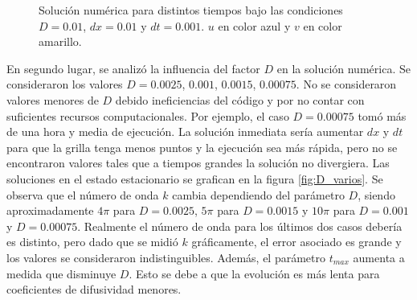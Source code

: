 \documentclass[aps,prb,twocolumn,superscriptaddress,floatfix,longbibliography]{revtex4-2}
\newcounter{para}
\begin{document}
\begin{figure}[h]
\begin{subfigure}[b]{0.3\textwidth}
         \caption{\label{fig:D_0.01_t3}}
     \end{subfigure}
        \caption{Solución numérica para distintos tiempos bajo las condiciones $D = 0.01$, $dx = 0.01$ y $dt = 0.001$. $u$ en color azul y $v$ en color amarillo.}
        \label{fig:D_0.01}
\end{figure}

En segundo lugar, se analizó la influencia del factor $D$ en la solución numérica. Se consideraron los valores $D = 0.0025$, $0.001$, $0.0015$, $0.00075$. No se consideraron valores menores de $D$ debido ineficiencias del código y por no contar con suficientes recursos computacionales. Por ejemplo, el caso $D = 0.00075$ tomó más de una hora y media de ejecución. La solución inmediata sería aumentar $dx$ y $dt$ para que la grilla tenga menos puntos y la ejecución sea más rápida, pero no se encontraron valores tales que a tiempos grandes la solución no divergiera. Las soluciones en el estado estacionario se grafican en la figura \ref{fig:D_varios}. Se observa que el número de onda $k$ cambia dependiendo del parámetro $D$, siendo aproximadamente $4 \pi$ para $D = 0.0025$, $5 \pi$ para $D = 0.0015$ y $10 \pi$ para $D = 0.001$ y $D = 0.00075$. Realmente el número de onda para los últimos dos casos debería es distinto, pero dado que se midió $k$ gráficamente, el error asociado es grande y los valores se consideraron indistinguibles. Además, el parámetro $t_{max}$ aumenta a medida que disminuye $D$. Esto se debe a que la evolución es más lenta para coeficientes de difusividad menores.
\end{document}
